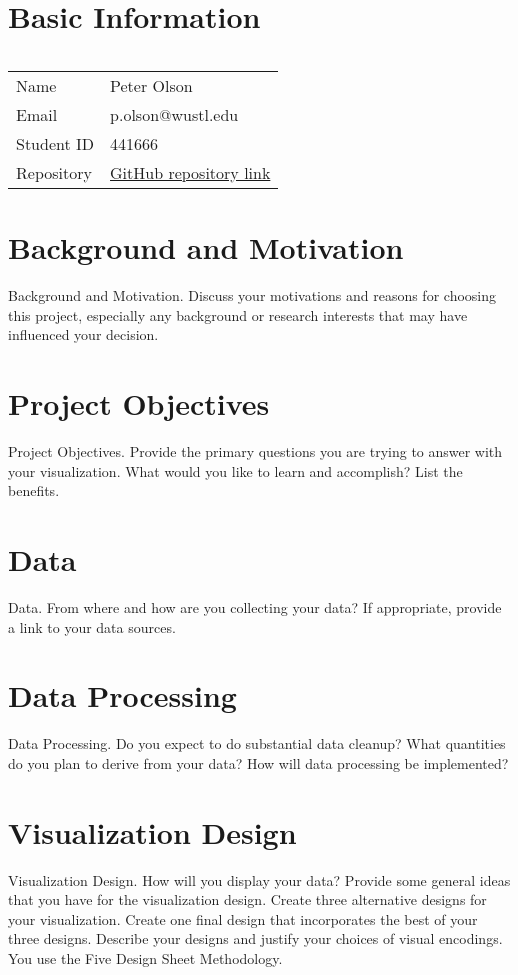 



\section{Basic Information}
$\ $

\begin{tabular}{ll}
	Name & Peter Olson \\
	Email & p.olson@wustl.edu \\
	Student ID & 441666 \\
	Repository & \href{https://github.com/BackToTheDrawingBoard/cse557-fl18-information-visualization-final-project}{GitHub repository link}
\end{tabular}


\section{Background and Motivation}
Background and Motivation. Discuss your motivations and reasons for
choosing this project, especially any background or research interests
that may have influenced your decision.

\section{Project Objectives}
Project Objectives. Provide the primary questions you are trying to
answer with your visualization. What would you like to learn and
accomplish? List the benefits.

\section{Data}
Data. From where and how are you collecting your data? If appropriate,
provide a link to your data sources.

\section{Data Processing}
Data Processing. Do you expect to do substantial data cleanup? What
quantities do you plan to derive from your data? How will data
processing be implemented?

\section{Visualization Design}
Visualization Design. How will you display your data? Provide some
general ideas that you have for the visualization design. Create three
alternative designs for your visualization. Create one final design that
incorporates the best of your three designs. Describe your designs and
justify your choices of visual encodings. You use the Five Design Sheet
Methodology.

